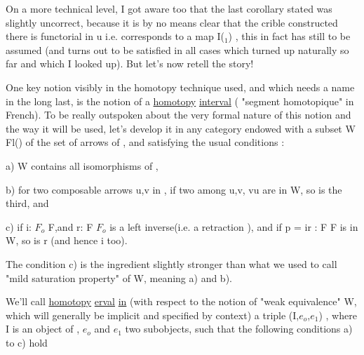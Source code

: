 
On a more technical level,  I got aware too that the last corollary
 stated was slightly uncorrect,  because it is by no means clear that the
crible  constructed there is  functorial in u  i.e. corresponds to a map
I\hand{\ensuremath{\to\alpha}}(\hand{\ensuremath{\Delta}}$_1$) ,  this in fact has still to be assumed  (and turns out to be
 satisfied in all cases which turned up naturally so far and which
I looked up).  But let's now retell the story!

One key notion visibly in the homotopy technique used,  and which
needs a name in the long last,  is the notion of a \uline{homotopy} \uline{interval}\xout{\unsure{,}}
( "segment homotopique" in French).  To be really outspoken about the very
formal nature of this notion and the way it will be used,  let's develop
it in any category  endowed with a subset  W \hand{\ensuremath{\subset}} Fl() of the set of
arrows of  , and satisfying the usual conditions :

a)  W contains all isomorphisms of  ,

b)  for two composable arrows u,v in ,  if  two among u,v, vu are
in W,  so is the third,  and

c)  if  i: $F_o$ \hand{\ensuremath{\to}} F,and r: F \hand{\ensuremath{\to}} $F_o$ is a left inverse(i.e. a retraction ),
and if  p = ir : F \hand{\ensuremath{\to}} F is in W,  so is r (and hence i too).

The condition c)  is the ingredient slightly stronger than what we used
to call "mild saturation property" of W,  meaning a) and b).

We'll call \uline{homotopy} \uline{erval} \uline{in}  (with respect to the notion of
"weak equivalence" W,  which will generally be implicit and specified by
context)  a triple (I,$e_o$,$e_1$) ,  where I is an object of  , $e_o$ and $e_1$
 two subobjects,  such that the following conditions a) to c) hold 

